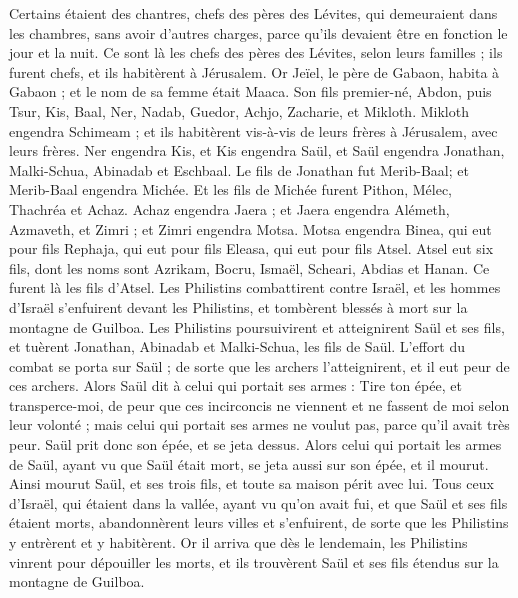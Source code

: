 \begin{multicols}{2}
Certains étaient des chantres, chefs des pères des Lévites, qui demeuraient dans les chambres, sans avoir d’autres charges, parce qu'ils devaient être en fonction le jour et la nuit.
Ce sont là les chefs des pères des Lévites, selon leurs familles ; ils furent chefs, et ils habitèrent à Jérusalem.
Or Jeïel, le père de Gabaon, habita à Gabaon ; et le nom de sa femme était Maaca.
Son fils premier-né, Abdon, puis Tsur, Kis, Baal, Ner, Nadab,
Guedor, Achjo, Zacharie, et Mikloth.
Mikloth engendra Schimeam ; et ils habitèrent vis-à-vis de leurs frères à Jérusalem, avec leurs frères.
Ner engendra Kis, et Kis engendra Saül, et Saül engendra Jonathan, Malki-Schua, Abinadab et Eschbaal.
Le fils de Jonathan fut  Merib-Baal; et Merib-Baal engendra Michée.
Et les fils de Michée furent Pithon, Mélec, Thachréa et Achaz.
Achaz engendra Jaera ; et Jaera engendra Alémeth, Azmaveth, et Zimri ; et Zimri engendra Motsa.
Motsa engendra Binea, qui eut pour fils Rephaja, qui eut pour fils Eleasa, qui eut pour fils Atsel.
Atsel eut six fils, dont les noms sont Azrikam, Bocru, Ismaël, Scheari, Abdias et Hanan. Ce furent là les fils d'Atsel.
\VerseOne{}Les Philistins combattirent contre Israël, et les hommes d'Israël s'enfuirent devant les Philistins, et tombèrent blessés à mort sur la montagne de Guilboa.
Les Philistins poursuivirent et atteignirent Saül et ses fils, et tuèrent Jonathan, Abinadab et Malki-Schua, les fils de Saül.
L’effort du combat se porta sur Saül ; de sorte que les archers l'atteignirent, et il eut peur de ces archers.
Alors Saül dit à celui qui portait ses armes : Tire ton épée, et transperce-moi, de peur que ces incirconcis ne viennent et ne fassent de moi selon leur volonté ; mais celui qui portait ses armes ne voulut pas, parce qu’il avait très peur. Saül prit donc son épée, et se jeta dessus.
Alors celui qui portait les armes de Saül, ayant vu que Saül était mort, se jeta aussi sur son épée, et il mourut.
Ainsi mourut Saül, et ses trois fils, et toute sa maison périt avec lui.
Tous ceux d'Israël, qui étaient dans la vallée, ayant vu qu'on avait fui, et que Saül et ses fils étaient morts, abandonnèrent leurs villes et s'enfuirent, de sorte que les Philistins y entrèrent et y habitèrent.
Or il arriva que dès le lendemain, les Philistins vinrent pour dépouiller les morts, et ils trouvèrent Saül et ses fils étendus sur la montagne de Guilboa.

\end{multicols}
